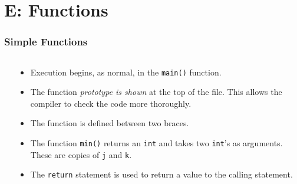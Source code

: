 \section{E: Functions}

\begin{frame}[fragile]
\frametitle{Simple Functions}
\begin{columns}

\begin{column}{0.40\textwidth}

\end{column}

\pause
\begin{column}{0.50\textwidth}
\begin{itemize}[<+->]
\item Execution begins, as normal, in the \verb^main()^ function.
\item The function {\it prototype is shown} at the top of the file.
This allows the compiler to check the code more thoroughly.
\item The function is defined between two braces.
\item The function \verb^min()^ returns an \verb^int^ and takes
two \verb^int^'s as arguments. These are copies of {\tt j} and {\tt k}.
\item The \verb^return^ statement is used to return a value
to the calling statement.
\end{itemize}
\end{column}

\end{columns}
\end{frame}



